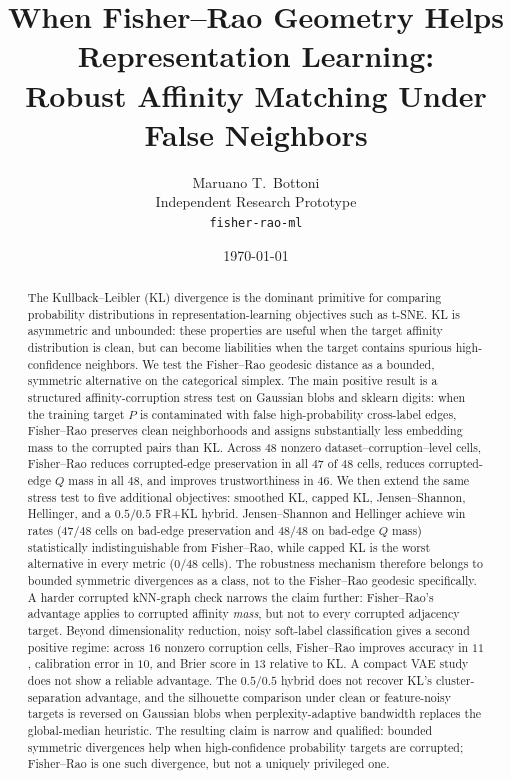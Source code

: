 \documentclass[11pt]{article}
\title{When Fisher--Rao Geometry Helps Representation Learning:\\
Robust Affinity Matching Under False Neighbors}
\author{
  Maruano T.\ Bottoni \\
  Independent Research Prototype \\
  \texttt{fisher-rao-ml}
}
\date{\today}
\begin{document}
\maketitle

\begin{abstract}
The Kullback--Leibler (KL) divergence is the dominant primitive for comparing probability
distributions in representation-learning objectives such as t-SNE. KL is asymmetric and
unbounded: these properties are useful when the target affinity distribution is clean, but can
become liabilities when the target contains spurious high-confidence neighbors. We test the
Fisher--Rao geodesic distance as a bounded, symmetric alternative on the categorical simplex.
The main positive result is a structured affinity-corruption stress test on Gaussian blobs and
sklearn digits: when the training target $P$ is contaminated with false high-probability
cross-label edges, Fisher--Rao preserves clean neighborhoods and assigns substantially less
embedding mass to the corrupted pairs than KL. Across $48$ nonzero
dataset--corruption--level cells, Fisher--Rao reduces corrupted-edge preservation in all
$47$ of $48$ cells, reduces corrupted-edge $Q$ mass in all $48$, and improves trustworthiness in
$46$.
We then extend the same stress test to five additional objectives: smoothed KL, capped KL,
Jensen--Shannon, Hellinger, and a $0.5/0.5$ FR+KL hybrid. Jensen--Shannon and Hellinger
achieve win rates ($47/48$ cells on bad-edge preservation and $48/48$ on bad-edge $Q$ mass)
statistically indistinguishable from Fisher--Rao, while capped KL is the worst alternative in
every metric ($0/48$ cells). The robustness mechanism therefore belongs to bounded symmetric
divergences as a class, not to the Fisher--Rao geodesic specifically. A harder corrupted
kNN-graph check narrows the claim further: Fisher--Rao's advantage applies to corrupted
affinity \emph{mass}, but not to every corrupted adjacency target. Beyond dimensionality
reduction, noisy soft-label classification gives a second positive regime: across $16$ nonzero
corruption cells, Fisher--Rao improves accuracy in $11$, calibration error in $10$, and Brier
score in $13$ relative to KL. A compact VAE study does not show a reliable advantage.
The $0.5/0.5$ hybrid does not recover KL's cluster-separation advantage, and the silhouette
comparison under clean or feature-noisy targets is reversed on Gaussian blobs when
perplexity-adaptive bandwidth replaces the global-median heuristic. The resulting claim is
narrow and qualified: bounded symmetric divergences help when high-confidence probability
targets are corrupted; Fisher--Rao is one such divergence, but not a uniquely privileged one.
\end{abstract}
\end{document}
